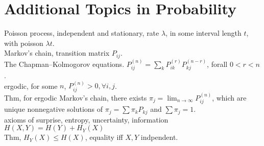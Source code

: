 \documentclass[paper=a4, fontsize=11pt]{scrartcl} %
\numberwithin{equation}{section} %
\numberwithin{figure}{section} %
\numberwithin{table}{section} %
\begin{document}
\section{Additional Topics in Probability}
Poisson process, independent and stationary, rate $\lambda$, in some interval length $t$, with poisson $\lambda t$.\\
Markov's chain, transition matrix $P_{ij}$.\\
The Chapman–Kolmogorov equations. $P_{ij}^{(n)} = \sum_k P_{ik}^{(r)} P_{kj}^{(n-r)}$, forall $0<r<n$.\\
ergodic, for some $n$, $P_{ij}^{(n)}>0,\forall i,j$.\\
Thm, for ergodic Markov's chain, there exists $\pi_j= \lim_{n\rightarrow \infty} P_{ij}^{(n)}$, which are unique nonnegative solutions of $\pi_j = \sum \pi_k P_{kj}$ and $\sum \pi_j=1$.\\
axioms of surprise, entropy, uncertainty, information\\
$H(X,Y) = H(Y) + H_Y(X)$\\
Thm, $H_Y(X)\leq H(X)$, equality iff $X,Y$ indpendent.\\
\end{document}
